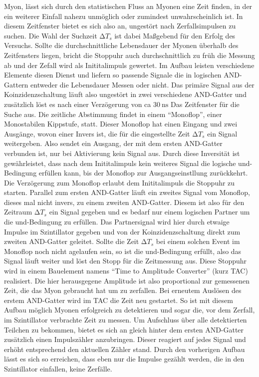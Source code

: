 Myon, lässt sich durch den statistischen Fluss an Myonen eine Zeit finden, in der ein weiterer Einfall nahezu unmöglich oder zumindest unwahrscheinlich ist.
In diesem Zeitfenster bietet es sich also an, ungestört nach Zerfallsimpulsen zu suchen. Die Wahl der Suchzeit $\increment T_s$
ist dabei Maßgebend für den Erfolg des Versuchs. Sollte die durchschnittliche Lebensdauer der Myonen überhalb des Zeitfensters liegen, 
bricht die Stoppuhr auch durchschnittlich zu früh die Messung ab und der Zefall wird als Inititalimpuls gewertet. 
Im Aufbau leisten verschiedene Elemente diesen Dienst und liefern so passende Signale die in logischen AND-Gattern entweder die Lebensdauer Messen oder nicht.
Das primäre Signal aus der Koinzidenzschaltung läuft also ungestört in zwei verschiedene AND-Gatter und zusätzlich löst es nach einer Verzögerung von ca $\SI{30}{\nano\second}$
Das Zeitfenster für die Suche aus.
Die zeitliche Abstimmung findet in einem \enquote{Monoflop}, einer Monostabilen Kippstufe, statt. Dieser Monoflop
hat einen Eingang und zwei Ausgänge, wovon einer Invers ist, die für die eingestellte Zeit $\increment T_s$ ein Signal weitergeben. Also sendet ein Ausgang, der mit dem ersten AND-Gatter verbunden ist,
nur bei Aktivierung kein Signal aus. Durch diese Inversität ist gewährleistet, dass nach dem Inititalimpuls kein weiteres Signal die logische und-Bedingung erfüllen kann, bis 
der Monoflop zur Ausgangseinstllung zurückkehrt. Die Verzögerung zum Monoflop erlaubt dem Inititalimpuls die Stoppuhr zu starten. 
Parallel zum ersten AND-Gatter läuft ein zweites Signal vom Monoflop, dieses mal nicht invers, zu einem zweiten AND-Gatter.
Diesem ist also für den Zeitraum $\increment T_s$ ein Signal gegeben und es bedarf nur einem logischen Partner um die und-Bedingung zu erfüllen. 
Das Partnersignal wird hier durch etwaige Impulse im Szintillator gegeben und von der Koinzidenzschaltung direkt zum zweiten AND-Gatter geleitet.
Sollte die Zeit $\increment T_s$ bei einem solchen Event im Monoflop noch nicht agelaufen sein, so ist die und-Bedingung erfüllt,
also das Signal läuft weiter und löst den Stopp für die Zeitmessung aus.
Diese Stoppuhr wird in einem Bauelement namens \enquote{Time to Amplitude Converter} (kurz TAC) realisiert. 
Die hier herausgegene Amplitude ist also proportional zur gemessenen Zeit, die das Myon gebraucht hat um zu zerfallen. Bei erneutem Auslösen des erstem AND-Gatter wird 
im TAC die Zeit neu gestartet.
So ist mit diesem Aufbau möglich Myonen erfolgreich zu detektieren und sogar die, vor dem Zerfall, im Szintillator verbrachte Zeit zu messen.
Um Aufschluss über alle detektierten Teilchen zu bekommen, bietet es sich an gleich hinter dem ersten AND-Gatter zusätzlich einen Impulszähler anzubringen. 
Dieser reagiert auf jedes Signal und erhöht entsprechend den aktuellen Zähler stand. Durch den vorherigen Aufbau lässt es sich so erreichen, dass eben nur die Impulse gezählt werden, die 
in den Szintillator einfallen, keine Zerfälle.













